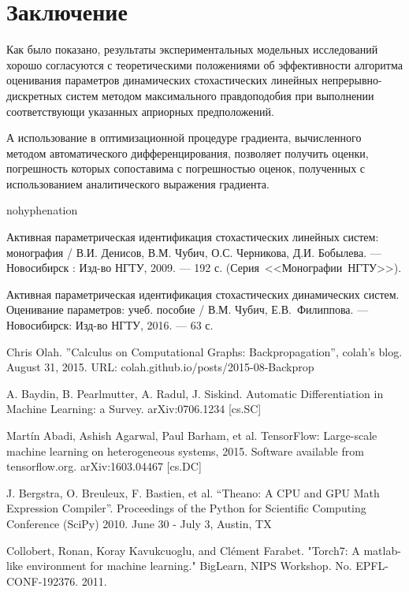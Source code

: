 \documentclass[a4paper,14pt]{extarticle}
\begin{document}
\section*{Заключение}

Как было показано, результаты экспериментальных модельных исследований хорошо
согласуются с теоретическими положениями об эффективности алгоритма оценивания
параметров динамических стохастических линейных непрерывно-дискретных систем
методом максимального правдоподобия при выполнении соответствующи указанных
априорных предположений. 

А использование в оптимизационной процедуре градиента,
вычисленного методом автоматического дифференцирования, позволяет получить
оценки, погрешность которых сопоставима с погрешностью оценок, полученных с
использованием аналитического выражения градиента.

\begin{thebibliography}{9}

\begin{hyphenrules}{nohyphenation} 


\begin{sloppypar}

 Активная параметрическая идентификация стохастических
линейных систем: монография / В.И. Денисов, В.М. Чубич, О.С. Черникова, Д.И.
	Бобылева. --- Новосибирск : Изд-во НГТУ, 2009. --- 192 с.
	\mbox{(Серия <<Монографии НГТУ>>)}.

 Активная параметрическая идентификация стохастических
	динамических систем. Оценивание параметров: учеб. пособие / В.М. Чубич,
	\mbox{Е.В. Филиппова}. --- Новосибирск: Изд-во НГТУ, 2016. --- 63 с.

 Chris Olah. ''Calculus on Computational Graphs:
Backpropagation'', colah's blog. August 31, 2015.
URL: colah.github.io/posts/2015-08-Backprop

 A. Baydin, B. Pearlmutter, A. Radul, J. Siskind.
Automatic Differentiation in Machine Learning: a Survey. {arXiv:0706.1234 [cs.SC]}

 Martín Abadi, Ashish Agarwal, Paul Barham, et al.
TensorFlow: Large-scale machine learning on heterogeneous systems,
2015. Software available from tensorflow.org. {arXiv:1603.04467 [cs.DC]}

 J. Bergstra, O. Breuleux, F. Bastien, et al. “Theano: A CPU
and GPU Math Expression Compiler”. Proceedings of the Python for Scientific
Computing Conference (SciPy) 2010. June 30 - July 3, Austin, TX

 Collobert, Ronan, Koray Kavukcuoglu, and Clément Farabet.
"Torch7: A matlab-like environment for machine learning." BigLearn, NIPS
Workshop. No. EPFL-CONF-192376. 2011.

\end{sloppypar}

\end{hyphenrules}

\end{thebibliography}
\end{document}
